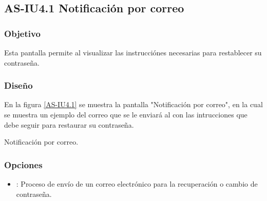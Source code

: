%

\subsection{AS-IU4.1 Notificación por correo}

\subsubsection{Objetivo}
Esta pantalla permite al  visualizar las instrucciónes necesarias para restablecer su contraseña.

\subsubsection{Diseño}
En la figura \ref{AS-IU4.1} se muestra la pantalla "Notificación por correo", en la cual se muestra un ejemplo del correo que se le enviará al  con las intrucciones que debe seguir para restaurar su contraseña.


{Notificación por correo.} 

\subsubsection{Opciones}
\begin{itemize}
	\item {}: Proceso de envío de un correo 
	electrónico para la recuperación o cambio de contraseña.
\end{itemize}
